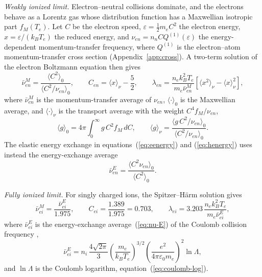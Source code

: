 \emph{Weakly ionized limit.} Electron--neutral collisions dominate, and the electrons behave as a Lorentz gas whose distribution function has a Maxwellian isotropic part \(f_M(T_e)\). Let \(C\) be the electron speed, \(\varepsilon=\tfrac12m_eC^2\) the electron energy, \(x=\varepsilon/(k_BT_e)\) the reduced energy, and \(\nu_{en}=n_nCQ^{(1)}(\varepsilon)\) the energy-dependent momentum-transfer frequency, where \(Q^{(1)}\) is the electron--atom momentum-transfer cross section (Appendix~\ref{app:cross}). A two-term solution of the electron Boltzmann equation then gives
\begin{equation}
\bar\nu^M_{en}=\frac{\langle C^2\rangle_0}{\langle C^2/\nu_{en}\rangle_0},\qquad
C_{en}=\langle x\rangle_\nu-\frac52,\qquad
\lambda_{en}=\frac{n_ek_B^2T_e}{m_e\bar\nu^M_{en}}\left[\langle x^2\rangle_\nu-\langle x\rangle_\nu^2\right],
\label{eq:nu-M}
\end{equation}
where \(\bar\nu^M_{en}\) is the momentum-transfer average of \(\nu_{en}\), \(\langle\cdot\rangle_0\) is the Maxwellian average, and \(\langle\cdot\rangle_\nu\) is the transport average with the weight \(C^4f_M/\nu_{en}\),
\begin{equation}
\langle g\rangle_0=4\pi\int_0^\infty g\,C^2f_M\,dC,\qquad
\langle g\rangle_\nu=\frac{\langle g\,C^2/\nu_{en}\rangle_0}{\langle C^2/\nu_{en}\rangle_0} .
\label{eq:lorentz-avg}
\end{equation}
The elastic energy exchange in equations~(\ref{eq:eenergy}) and (\ref{eq:henergy}) uses instead the energy-exchange average
\begin{equation}
\bar\nu^E_{en}=\frac{\langle C^2\nu_{en}\rangle_0}{\langle C^2\rangle_0} .
\label{eq:nu-E}
\end{equation}

\emph{Fully ionized limit.} For singly charged ions, the Spitzer--H\"arm solution gives \cite{mitchner1973partially}
\begin{equation}
\bar\nu^M_{ei}=\frac{\bar\nu^E_{ei}}{1.975},\qquad
C_{ei}=\frac{1.389}{1.975}=0.703,\qquad
\lambda_{ei}=3.203\,\frac{n_ek_B^2T_e}{m_e\bar\nu^E_{ei}},
\label{eq:spitzer}
\end{equation}
where \(\bar\nu^E_{ei}\) is the energy-exchange average~(\ref{eq:nu-E}) of the Coulomb collision frequency \cite{mitchner1973partially},
\begin{equation}
\bar\nu^E_{ei}=n_i\,\frac{4\sqrt{2\pi}}{3}\left(\frac{m_e}{k_BT_e}\right)^{3/2}
\left(\frac{e^2}{4\pi\varepsilon_0m_e}\right)^2\ln\Lambda ,
\label{eq:nu-ei}
\end{equation}
and \(\ln\Lambda\) is the Coulomb logarithm, equation~(\ref{eq:coulomb-log}).

